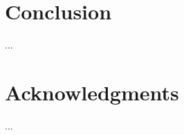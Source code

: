 \documentclass{sigchi}
\begin{document}
\section{Conclusion}

...

\section{Acknowledgments}

...

%
%
%
%
%
\balance{}

\balance{}



\end{document}
